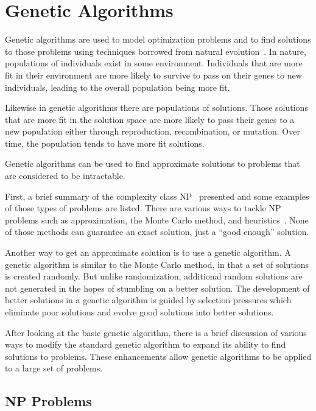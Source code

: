 \clearpage
\chapter{Genetic Algorithms}\label{chap:geneticAlgorithms}

Genetic algorithms are used to model optimization problems and to find solutions
to those problems using techniques borrowed from natural
evolution~\cite{Holland1992,goldberg1989genetic,fogel2000evolutionary}. In
nature, populations of individuals exist in some environment. Individuals that
are more fit in their environment are more likely to survive to pass on their
genes to new individuals, leading to the overall population being more fit.

Likewise in genetic algorithms there are populations of solutions. Those
solutions that are more fit in the solution space are more likely to pass their
genes to a new population either through reproduction, recombination, or
mutation. Over time, the population tends to have more fit solutions.

Genetic algorithms can be used to find approximate solutions to problems that
are considered to be intractable.

First, a brief summary of the complexity class
NP~\cite{alsuwaiyel1999algorithms,Cormen:2009:IAT:1614191} presented and some
examples of those types of problems are listed. There are various ways to tackle
NP problems such as approximation, the Monte Carlo method, and
heuristics~\cite{russell2010artificial}. None of those methods can guarantee an
exact solution, just a ``good enough'' solution.

Another way to get an approximate solution is to use a genetic algorithm. A
genetic algorithm is similar to the Monte Carlo method, in that a set of
solutions is created randomly. But unlike randomization, additional random
solutions are not generated in the hopes of stumbling on a better solution.
The development of better solutions in a genetic algorithm is guided by
selection pressures which eliminate poor solutions and evolve good solutions
into better solutions.

After looking at the basic genetic algorithm, there is a brief discussion of
various ways to modify the standard genetic algorithm to expand its ability to
find solutions to problems. These enhancements allow genetic algorithms to be
applied to a large set of problems.

\section{NP Problems}

